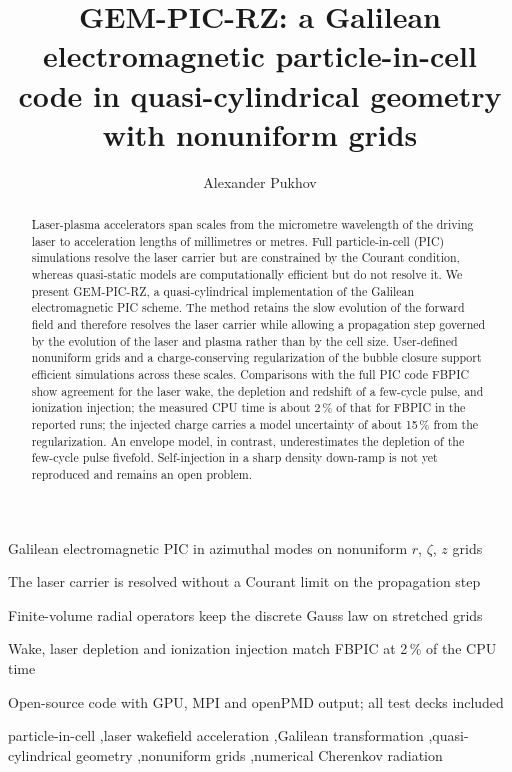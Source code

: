 \documentclass[preprint,12pt]{elsarticle}
\begin{document}
\begin{frontmatter}

\title{GEM-PIC-RZ: a Galilean electromagnetic particle-in-cell code in quasi-cylindrical geometry with nonuniform grids}

\author{Alexander Pukhov}

\begin{abstract}
Laser-plasma accelerators span scales from the micrometre wavelength of the driving laser to acceleration lengths of millimetres or metres. Full particle-in-cell (PIC) simulations resolve the laser carrier but are constrained by the Courant condition, whereas quasi-static models are computationally efficient but do not resolve it. We present GEM-PIC-RZ, a quasi-cylindrical implementation of the Galilean electromagnetic PIC scheme. The method retains the slow evolution of the forward field and therefore resolves the laser carrier while allowing a propagation step governed by the evolution of the laser and plasma rather than by the cell size. User-defined nonuniform grids and a charge-conserving regularization of the bubble closure support efficient simulations across these scales. Comparisons with the full PIC code FBPIC show agreement for the laser wake, the depletion and redshift of a few-cycle pulse, and ionization injection; the measured CPU time is about 2\,\% of that for FBPIC in the reported runs;  the injected charge carries a model uncertainty of about 15\,\% from the regularization. An envelope model, in contrast, underestimates the depletion of the few-cycle pulse fivefold. Self-injection in a sharp density down-ramp is not yet reproduced and remains an open problem.
\end{abstract}

\begin{highlights}
\item Galilean electromagnetic PIC in azimuthal modes on nonuniform $r$, $\zeta$, $z$ grids
\item The laser carrier is resolved without a Courant limit on the propagation step
\item Finite-volume radial operators keep the discrete Gauss law on stretched grids
\item Wake, laser depletion and ionization injection match FBPIC at 2\,\% of the CPU time
\item Open-source code with GPU, MPI and openPMD output; all test decks included
\end{highlights}

\begin{keyword}
particle-in-cell \sep laser wakefield acceleration \sep Galilean transformation \sep quasi-cylindrical geometry \sep nonuniform grids \sep numerical Cherenkov radiation
\end{keyword}

\end{frontmatter}
\end{document}
